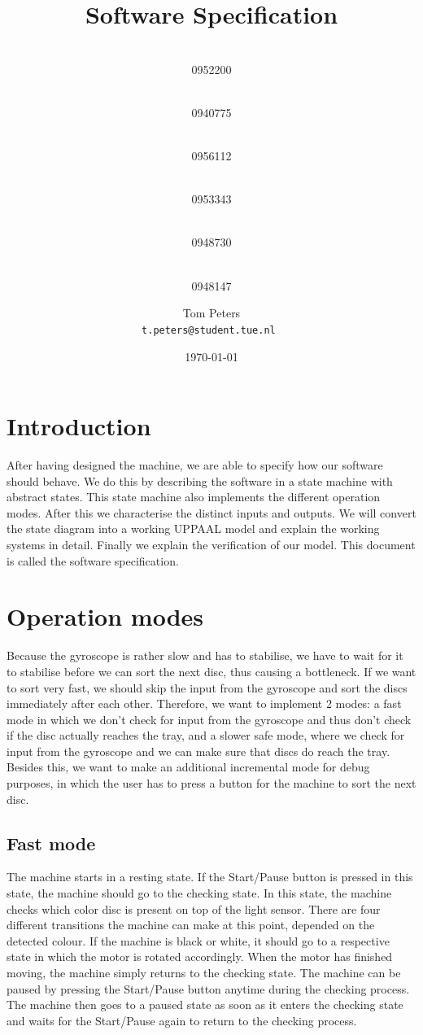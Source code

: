 \documentclass[a4paper,oneside,11pt]{article}
\title{\vspace{-\baselineskip}\sffamily\bfseries Software Specification}
\author{
	\makebox[.25\linewidth]{Sergio van Amerongen}\\0952200 \and
	\makebox[.25\linewidth]{Stefan Cloudt}\\0940775 \and
	\makebox[.25\linewidth]{Daan de Graaf}\\0956112 \and
	\makebox[.25\linewidth]{Robert van Lente}\\0953343 \and
	\makebox[.25\linewidth]{Tom Peters}\\0948730 \and
	\makebox[.25\linewidth]{Berrie Trippe}\\0948147 
	\and \makebox[.75\linewidth]{\textbf{Responsible:}} \and
	Tom Peters\\ \tt{t.peters@student.tue.nl}
}
\date{\today}
\begin{document}
\maketitle

\section{Introduction}
After having designed the machine, we are able to specify how our software should behave. We do this by describing the software in a state machine with abstract states. This state machine also implements the different operation modes. After this we characterise the distinct inputs and outputs. We will convert the state diagram into a working UPPAAL model and explain the working systems in detail. Finally we explain the verification of our model. This document is called the software specification.

\section{Operation modes}
Because the gyroscope is rather slow and has to stabilise, we have to wait for it to stabilise before we can sort the next disc, thus causing a bottleneck. If we want to sort very fast, we should skip the input from the gyroscope and sort the discs immediately after each other. Therefore, we want to implement 2 modes: a fast mode in which we don’t check for input from the gyroscope and thus don’t check if the disc actually reaches the tray, and a slower safe mode, where we check for input from the gyroscope and we can make sure that discs do reach the tray. Besides this, we want to make an additional incremental mode for debug purposes, in which the user has to press a button for the machine to sort the next disc.

\subsection{Fast mode}
The machine starts in a resting state. If the Start/Pause button is pressed in this state, the machine should go to the checking state. In this state, the machine checks which color disc is present on top of the light sensor. There are four different transitions the machine can make at this point, depended on the detected colour. If the machine is black or white, it should go to a respective state in which the motor is rotated accordingly. When the motor has finished moving, the machine simply returns to the checking state. The machine can be paused by pressing the Start/Pause button anytime during the checking process. The machine then goes to a paused state as soon as it enters the checking state and waits for the Start/Pause again to return to the checking process.
\end{document}
